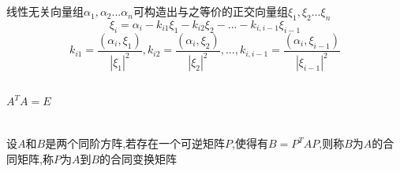 \documentclass[11pt, a4paper, UTF8]{ctexart}
\begin{document}
\section{}
\subsection{}
线性无关向量组$\alpha_1,\alpha_2...\alpha_n$可构造出与之等价的正交向量组$\xi_1,\xi_2...\xi_n$
\[\xi_i=\alpha_i-k_{i1}\xi_1-k_{i2}\xi_2-...-k_{i,i-1}\xi_{i-1}\]
\[k_{i1}=\dfrac{(\alpha_i,\xi_1)}{|\xi_1|^2},k_{i2}=\dfrac{(\alpha_i,\xi_2)}{|\xi_2|^2},...,k_{i,i-1}=\dfrac{(\alpha_i,\xi_{i-1})}{|\xi_{i-1}|^2}\]
\subsection{}
$A^TA=E$
\section{}
设$A$和$B$是两个同阶方阵,若存在一个可逆矩阵$P$,使得有$B=P^TAP$,则称$B$为$A$的合同矩阵,称$P$为$A$到$B$的合同变换矩阵
\end{document}
